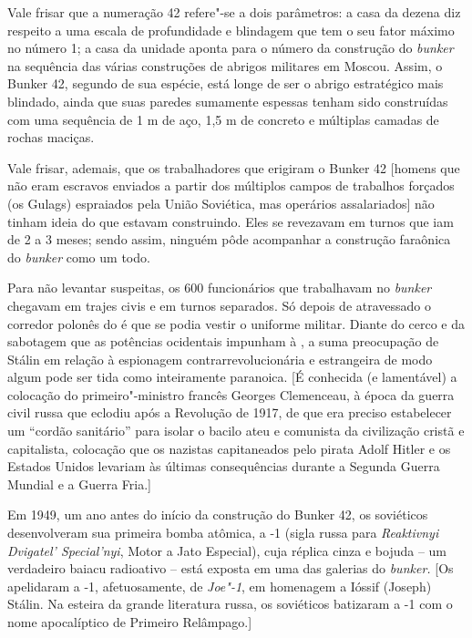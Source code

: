Vale frisar que a numeração 42 refere"-se a dois parâmetros: a casa da
dezena diz respeito a uma escala de profundidade e blindagem que tem o
seu fator máximo no número 1; a casa da unidade aponta para o número da
construção do \emph{bunker} na sequência das várias construções de
abrigos militares em Moscou. Assim, o Bunker 42, segundo de sua espécie,
está longe de ser o abrigo estratégico mais blindado, ainda que suas
paredes sumamente espessas tenham sido construídas com uma sequência de
1 m de aço, 1,5 m de concreto e múltiplas camadas de rochas maciças.

Vale frisar, ademais, que os trabalhadores que erigiram o Bunker 42
{[}homens que não eram escravos enviados a partir dos múltiplos campos
de trabalhos forçados (os Gulags) espraiados pela União Soviética, mas
operários assalariados{]} não tinham ideia do que estavam construindo.
Eles se revezavam em turnos que iam de 2 a 3 meses; sendo assim, ninguém
pôde acompanhar a construção faraônica do \emph{bunker} como um todo.

Para não levantar suspeitas, os 600 funcionários que trabalhavam no
\emph{bunker} chegavam em trajes civis e em turnos separados. Só depois
de atravessado o corredor polonês do  é que se podia vestir o
uniforme militar. Diante do cerco e da sabotagem que as potências
ocidentais impunham à , a suma preocupação de Stálin em relação à
espionagem contrarrevolucionária e estrangeira de modo algum pode ser
tida como inteiramente paranoica. {[}É conhecida (e lamentável) a
colocação do primeiro"-ministro francês Georges Clemenceau, à época da
guerra civil russa que eclodiu após a Revolução de 1917, de que era
preciso estabelecer um ``cordão sanitário'' para isolar o bacilo ateu e
comunista da civilização cristã e capitalista, colocação que os nazistas
capitaneados pelo pirata Adolf Hitler e os Estados Unidos levariam às
últimas consequências durante a Segunda Guerra Mundial e a Guerra
Fria.{]}

Em 1949, um ano antes do início da construção do Bunker 42, os
soviéticos desenvolveram sua primeira bomba atômica, a -1 (sigla
russa para \emph{Reaktivnyi Dvigatel' Special'nyi}, Motor a Jato
Especial), cuja réplica cinza e bojuda -- um verdadeiro baiacu
radioativo -- está exposta em uma das galerias do \emph{bunker.} {[}Os
 apelidaram a -1, afetuosamente, de \emph{Joe"-1}, em homenagem a
Ióssif (Joseph) Stálin. Na esteira da grande literatura russa, os
soviéticos batizaram a -1 com o nome apocalíptico de Primeiro
Relâmpago.{]}


